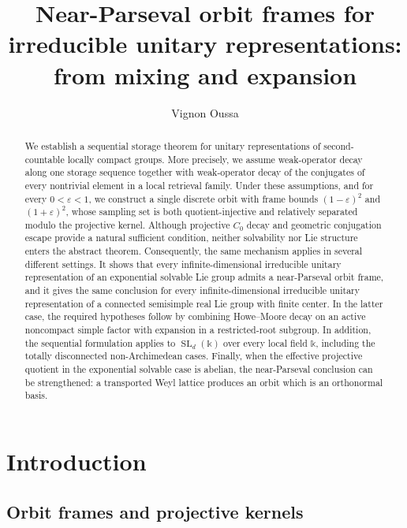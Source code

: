\documentclass[reqno]{amsart}
\title[Near-Parseval orbits from mixing and expansion]
{Near-Parseval orbit frames for irreducible unitary representations:\\
from mixing and expansion}
\author{Vignon Oussa}
\numberwithin{equation}{section}
\theoremstyle{definition}
\theoremstyle{remark}
\begin{document}
\begin{abstract}
We establish a sequential storage theorem for unitary representations of
second-countable locally compact groups.  More precisely, we assume
weak-operator decay along one storage sequence together with weak-operator
decay of the conjugates of every nontrivial element in a local retrieval
family.  Under these assumptions, and for every $0<\varepsilon<1$, we
construct a single discrete orbit with frame bounds $(1-\varepsilon)^2$ and
$(1+\varepsilon)^2$, whose sampling set is both quotient-injective and
relatively separated modulo the projective kernel.  Although projective
$C_0$ decay and geometric conjugation escape provide a natural sufficient
condition, neither solvability nor Lie structure enters the abstract theorem.
Consequently, the same mechanism applies in several different settings.  It
shows that every infinite-dimensional irreducible unitary representation of
an exponential solvable Lie group admits a near-Parseval orbit frame, and it
gives the same conclusion for every infinite-dimensional irreducible unitary
representation of a connected semisimple real Lie group with finite center.
In the latter case, the required hypotheses follow by combining Howe--Moore
decay on an active noncompact simple factor with expansion in a restricted-root
subgroup.  In addition, the sequential formulation applies to
$\operatorname{SL}_d(\mathbb k)$ over every local field $\mathbb k$, including
the totally disconnected non-Archimedean cases.  Finally, when the effective
projective quotient in the exponential solvable case is abelian, the
near-Parseval conclusion can be strengthened: a transported Weyl lattice
produces an orbit which is an orthonormal basis.
\end{abstract}

\maketitle
\enlargethispage{4pt}

\section{Introduction}\label{sec:introduction}

\subsection{Orbit frames and projective kernels}
\end{document}
